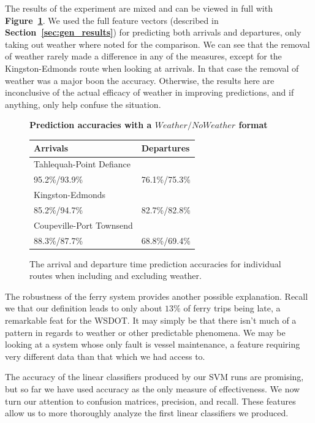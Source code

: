 \documentclass[11pt]{article} %
\begin{document}
The results of the experiment are mixed and can be viewed in full with 
\textbf{Figure~\ref{fig:weatherExperiment}}. We used the full feature vectors 
(described in \textbf{Section~\ref{sec:gen_results}}) for 
predicting both arrivals and departures, only taking out weather where noted
for the comparison. We can see that the removal of weather rarely made a difference
in any of the measures, except for the Kingston-Edmonds route when looking at 
arrivals. In that case the removal of weather was a major boon the accuracy. 
Otherwise, the results here are inconclusive of the actual efficacy of weather
in improving predictions, and if anything, only help confuse the situation.

\begin{figure}
    \centering
    \textbf{Prediction accuracies with a $Weather/NoWeather$ format}

    \begin{tabular}{ll}
        \textbf{Arrivals} & \textbf{Departures}\\
        \hline
        Tahlequah-Point Defiance    & \\
        95.2\%/93.9\% & 76.1\%/75.3\% \\
        Kingston-Edmonds    & \\
        85.2\%/94.7\% & 82.7\%/82.8\% \\
        Coupeville-Port Townsend     & \\
        88.3\%/87.7\% & 68.8\%/69.4\% 
    \end{tabular}
    \caption{The arrival and departure time prediction accuracies for individual 
        routes when including and excluding weather.}
    \label{fig:weatherExperiment}
\end{figure}

The robustness of the ferry system provides another possible explanation. Recall 
we that
our definition leads to only about $13\%$ of ferry trips being late, a remarkable 
feat for the WSDOT. It may simply be that there isn't much of a pattern in regards
to weather or other predictable phenomena. We may be looking at a system whose
only fault is vessel maintenance, a feature requiring very different data than
that which we had access to. 

The accuracy of the linear classifiers produced by our SVM runs are promising,
but so far we have used accuracy as the only measure of effectiveness. We now 
turn our attention to confusion matrices, precision, and recall. These features
allow us to more thoroughly analyze the first linear classifiers we produced.
\end{document}
